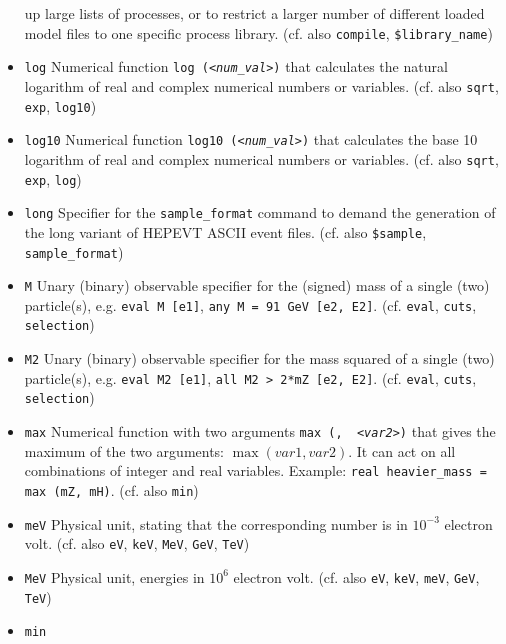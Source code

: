 \documentclass[12pt]{book}
\newcommand{\ttt}[1]{\texttt{#1}}
\begin{document}
\begin{itemize}
up large lists of processes, or to restrict a larger number of
different loaded model files to one specific process library.
(cf. also \ttt{compile}, \ttt{\$library\_name})
\item
\ttt{log} \newline
Numerical function \ttt{log ({\em <num\_val>})} that calculates the
natural logarithm of real and complex numerical numbers or
variables. (cf. also \ttt{sqrt}, \ttt{exp}, \ttt{log10})
\item
\ttt{log10} \newline
Numerical function \ttt{log10 ({\em <num\_val>})} that calculates the
base 10 logarithm of real and complex numerical numbers or
variables. (cf. also \ttt{sqrt}, \ttt{exp}, \ttt{log})
\item
\ttt{long} \newline
Specifier for the \ttt{sample\_format} command to demand the
generation of the long variant of HEPEVT ASCII event
files. (cf. also \ttt{\$sample},
\ttt{sample\_format})
\item
\ttt{M} \newline
Unary (binary) observable specifier for the (signed) mass of a single
(two) particle(s), e.g. \ttt{eval M [e1]}, \ttt{any M = 91 GeV [e2,
  E2]}. (cf. \ttt{eval}, \ttt{cuts}, \ttt{selection})
\item
\ttt{M2} \newline
Unary (binary) observable specifier for the mass squared of a single
(two) particle(s), e.g. \ttt{eval M2 [e1]}, \ttt{all M2 > 2*mZ [e2,
  E2]}. (cf. \ttt{eval}, \ttt{cuts}, \ttt{selection})
\item
\ttt{max} \newline
Numerical function with two arguments \ttt{max ({\em <var1>}, {\em
<var2>})} that gives the maximum of the two arguments: $\max (var1,
var2)$. It can act on all combinations of integer and real
variables. Example: \ttt{real heavier\_mass = max (mZ, mH)}. (cf. also
\ttt{min})
\item
\ttt{meV} \newline
Physical unit, stating that the corresponding number is in $10^{-3}$
electron volt. (cf. also \ttt{eV}, \ttt{keV}, \ttt{MeV}, \ttt{GeV},
\ttt{TeV})
\item
\ttt{MeV} \newline
Physical unit, energies in $10^6$ electron volt. (cf. also \ttt{eV},
\ttt{keV}, \ttt{meV}, \ttt{GeV}, \ttt{TeV})
\item
\ttt{min} \newline

\end{itemize}
\end{document}
